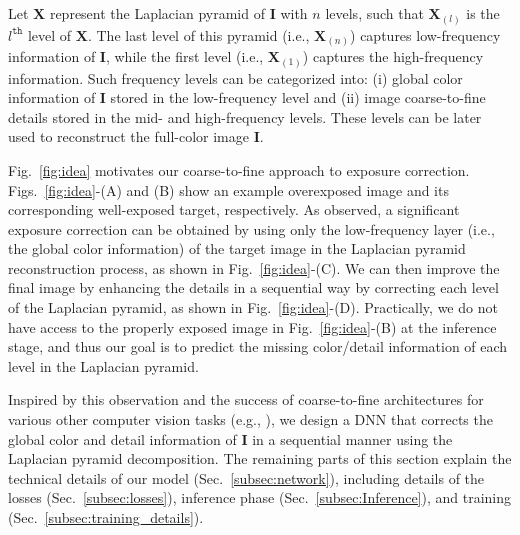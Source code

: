 \documentclass[final]{cvpr}
\begin{document}
Let $\mathbf{X}$ represent the Laplacian pyramid of $\mathbf{I}$ with $n$ levels, such that  $\mathbf{X}_{(l)}$ is the $l^\texttt{th}$ level of $\mathbf{X}$. The last level of this pyramid (i.e., $\mathbf{X}_{(n)}$) captures low-frequency information of $\mathbf{I}$, while the first level (i.e., $\mathbf{X}_{(1)}$) captures the high-frequency information. Such frequency levels can be categorized into: (i) global color information of $\mathbf{I}$ stored in the low-frequency level and (ii) image coarse-to-fine details stored in the mid- and high-frequency levels. These levels can be later used to reconstruct the full-color image $\mathbf{I}$.

Fig.\ \ref{fig:idea} motivates our coarse-to-fine approach to exposure correction.  Figs.\ \ref{fig:idea}-(A) and (B) show an example overexposed image and its corresponding well-exposed target, respectively.
As observed, a significant exposure correction can be obtained by  using only the low-frequency layer (i.e., the global color information) of the target image in the Laplacian pyramid reconstruction process, as shown in Fig.~\ref{fig:idea}-(C). We can then improve the final image by enhancing the details in a sequential way by correcting each level of the Laplacian pyramid, as shown in Fig.~\ref{fig:idea}-(D). Practically, we do not have access to the properly exposed image in Fig.~\ref{fig:idea}-(B) at the inference stage, and thus our goal is to predict the missing color/detail information of each level in the Laplacian pyramid.

Inspired by this observation and the success of coarse-to-fine architectures for various other computer vision tasks (e.g., \cite{denton2015deep, shaham2019singan, lai2017deep, ma2020efficient}), we design a DNN that corrects the global color and detail information of $\mathbf{I}$ in a sequential manner using the Laplacian pyramid decomposition.
The remaining parts of this section explain the technical details of our model (Sec.\ \ref{subsec:network}), including details of the losses (Sec.\ \ref{subsec:losses}),
inference phase (Sec.\ \ref{subsec:Inference}), and training (Sec.\ \ref{subsec:training_details}).
\end{document}
